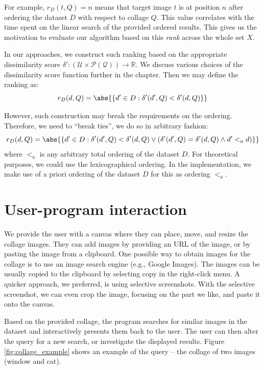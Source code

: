 For example, $r_D(t, Q) = n$ means that target image $t$ is at position $n$ after ordering the dataset $D$ with respect to collage $Q$. This value correlates with the time spent on the linear search of the provided ordered results. This gives us the motivation to evaluate our algorithm based on this \emph{rank} across the whole set $X$.

In our approaches, we construct such ranking based on the appropriate dissimilarity score $\delta': (\mathcal{U} \times \mathcal{P(Q)}) \rightarrow \mathbb{R}$. We discuss various choices of the dissimilarity score function further in the chapter. Then we may define the ranking as:
$$
    r_D(d, Q) = \abs{\{d' \in D : \delta'(d', Q) < \delta'(d, Q)\}}
$$


However, such construction may break the requirements on the ordering. Therefore, we need to ``break ties'', we do so in arbitrary fashion:
$$
    r_D(d, Q) = \abs{\left\{d' \in D : \delta'(d', Q) < \delta'(d, Q) \lor \left(\delta'(d', Q) = \delta'(d, Q) \land d' <_a d\right)\right\}}
$$
where $<_a$ is any arbitrary total ordering of the dataset $D$. For theoretical purposes, we could use the lexicographical ordering. In the implementation, we make use of a priori ordering of the dataset $D$ for this as ordering $<_a$.

\section{User-program interaction}

We provide the user with a canvas where they can place, move, and resize the collage images. They can add images by providing an URL of the image, or by pasting the image from a clipboard. One possible way to obtain images for the collage is to use an image search engine (e.g., Google Images). The images can be usually copied to the clipboard by selecting copy in the right-click menu. A quicker approach, we preferred, is using selective screenshots. With the selective screenshot, we can even crop the image, focusing on the part we like, and paste it onto the canvas.

Based on the provided collage, the program searches for similar images in the dataset and interactively presents them back to the user. The user can then alter the query for a new search, or investigate the displayed results. Figure \ref{fig:collage_example} shows an example of the query -- the collage of two images (window and cat). 

